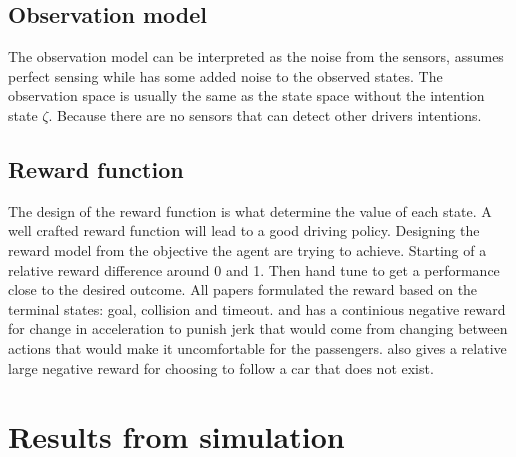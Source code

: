 \subsection{Observation model}
The observation model can be interpreted as the noise from the sensors, \paperLSTM assumes perfect sensing while \paperBelief has some added noise to the observed states. 
The observation space is usually the same as the state space without the intention state $\zeta$. Because there are no sensors that can detect other drivers intentions. 

\subsection{Reward function}
The design of the reward function is what determine the value of each state. A well crafted reward function will lead to a good driving policy. 
Designing the reward model from the objective the agent are trying to achieve. Starting of a relative reward difference around 0 and 1. Then hand tune to get a performance close to the desired outcome. 
All papers formulated the reward based on the terminal states: goal, collision and timeout. 
\paperLSTM and \paperMPC has a continious negative reward for change in acceleration to punish jerk that would come from changing between actions that would make it uncomfortable for the passengers. 
\paperLSTM also gives a relative large negative reward for choosing to follow a car that does not exist. 


\section{Results from simulation}


